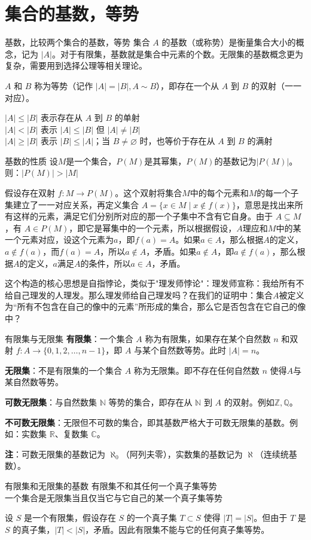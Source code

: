 \documentclass[lang=cn,11pt]{elegantbook}
\begin{document}
\section{集合的基数，等势}
\begin{definition}{基数，比较两个集合的基数，等势}
集合 $A$ 的基数（或称势）是衡量集合大小的概念，记为 $|A|$。对于有限集，基数就是集合中元素的个数。无限集的基数概念更为复杂，需要用到选择公理等相关理论。

$A$ 和 $B$ 称为等势（记作 $|A| = |B|,A\sim B$），即存在一个从 $A$ 到 $B$ 的双射（一一对应）。

$|A| \leqslant |B|$ 表示存在从 $A$ 到 $B$ 的单射\\
$|A| < |B|$ 表示 $|A| \leqslant |B|$ 但 $|A| \neq |B|$\\
$|A| \geqslant |B|$ 表示 $|B| \leqslant |A|$；当 $B\ne\varnothing$ 时，也等价于存在从 $A$ 到 $B$ 的满射
\end{definition}
\begin{theorem}{基数的性质}
设$M$是一个集合，$P(M)$是其幂集，$P(M)$的基数记为$|P(M)|$。则：$|P(M)|>|M|$
\end{theorem}
假设存在双射 $f: M \to P(M)$。这个双射将集合$M$中的每个元素和$M$的每一个子集建立了一一对应关系，再定义集合 $A = \{ x \in M \mid x \notin f(x) \}$，意思是找出来所有这样的元素，满足它们分别所对应的那一个子集中不含有它自身。由于 $A \subseteq M$，有 $A \in P(M)$，即它是幂集中的一个元素，所以根据假设，$A$理应和$M$中的某一个元素对应，设这个元素为$a$，即$f(a) = A$。如果$a \in A$，那么根据$A$的定义，$a \notin f(a)$，而$f(a) = A$，所以$a \notin A$，矛盾。如果$a \notin A$，即$a \notin f(a)$，那么根据$A$的定义，$a$满足$A$的条件，所以$a \in A$，矛盾。

这个构造的核心思想是自指悖论，类似于"理发师悖论"：理发师宣称：我给所有不给自己理发的人理发。那么理发师给自己理发吗？在我们的证明中：集合$A$被定义为“所有不包含在自己的像中的元素”所形成的集合，那么它是否包含在它自己的像中？
\begin{definition}{有限集与无限集}
\textbf{有限集}：一个集合 $A$ 称为有限集，如果存在某个自然数 $n$ 和双射 $f: A \to \{0, 1, 2, \dots, n-1\}$，即 $A$ 与某个自然数等势。此时 $|A| = n$。

\textbf{无限集}：不是有限集的一个集合 $A$ 称为无限集。即不存在任何自然数 $n$ 使得$A$与某自然数等势。

\textbf{可数无限集}：与自然数集 $\mathbb{N}$ 等势的集合，即存在从 $\mathbb{N}$ 到 $A$ 的双射。例如$\mathbb{Z},\mathbb{Q}$。

\textbf{不可数无限集}：无限但不可数的集合，即其基数严格大于可数无限集的基数。例如：实数集 $\mathbb{R}$、复数集 $\mathbb{C}$。

\textbf{注}：可数无限集的基数记为 $\aleph_0$（阿列夫零），实数集的基数记为 $\aleph$（连续统基数）。
\end{definition}
\begin{theorem}{有限集和无限集的基数}
    有限集不和其任何一个真子集等势\\一个集合是无限集当且仅当它与它自己的某一个真子集等势
\end{theorem}
设 $S$ 是一个有限集，假设存在 $S$ 的一个真子集 $T \subset S$ 使得 $|T| = |S|$。但由于 $T$ 是 $S$ 的真子集，$|T| < |S|$，矛盾。因此有限集不能与它的任何真子集等势。
\end{document}
